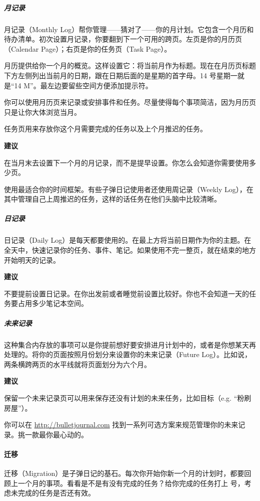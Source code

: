 \documentclass[a5paper]{article}
\begin{document}
\subparagraph{月记录}

月记录（Monthly Log）帮你管理——猜对了——你的月计划。它包含一个月历和待办清单。初次设置月记录，你要翻到下一个可用的跨页。左页是你的月历页（Calendar Page）；右页是你的任务页（Task Page）。

月历提供给你一个月的概览。这样设置它：将当前月作为标题。现在在月历页标题下方左侧列出当前月的日期，跟在日期后面的是星期的首字母。14 号星期一就是“14 M”。最左边要留些空间方便添加提示符。

你可以使用月历页来记录或安排事件和任务。尽量使得每个事项简洁，因为月历页只是让你大体浏览当月。

任务页用来存放你这个月需要完成的任务以及上个月推迟的任务。

\textbf{建议}

在当月末去设置下一个月的月记录，而不是提早设置。你怎么会知道你需要使用多少页。

\clearpage

使用最适合你的时间框架。有些子弹日记使用者还使用周记录（Weekly Log），在其中管理自己上周推迟的任务，这样的话任务在他们头脑中比较清晰。

\subparagraph{日记录}

日记录（Daily Log）是每天都要使用的。在最上方将当前日期作为你的主题。在全天中，快速记录你的任务、事件、笔记。如果使用不完一整页，就在结束的地方开始明天的记录。

\textbf{建议}

不要提前设置日记录。在你出发前或者睡觉前设置比较好。你也不会知道一天的任务要占用多少笔记本空间。

\subparagraph{未来记录}

这种集合内存放的事项可以是你提前想好要安排进月计划中的，或者是你想某天再处理的。将你的页面按照月份划分来设置你的未来记录（Future Log）。比如说，两条横跨两页的水平线就将页面划分为六个月。

\textbf{建议}

保留一个未来记录页可以用来保存还没有计划的未来任务，比如目标（e.g. “粉刷房屋”）。

你可以在 \href{http://bulletjournal.com}{http://bulletjournal.com} 找到一系列可选方案来规范管理你的未来记录。挑一款最你最心动的。

\clearpage

\paragraph{迁移}

迁移（Migration）是子弹日记的基石。每次你开始你新一个月的计划时，都要回顾上一个月的事项。看看是不是有没有完成的任务？给你完成的任务打上 \texttimes 号，考虑未完成的任务是否还有效。
\end{document}
